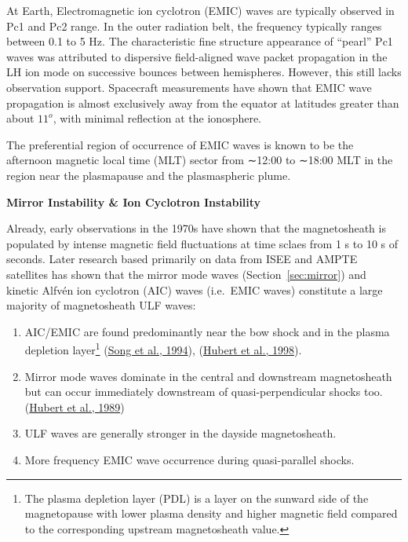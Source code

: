\documentclass[
  notoc %
]{tufte-book}
\providecommand{\tightlist}{%
  \setlength{\itemsep}{0pt}\setlength{\parskip}{0pt}
}
\begin{document}
At Earth, Electromagnetic ion cyclotron (EMIC) waves are typically
observed in Pc1 and Pc2 range. In the outer radiation belt, the
frequency typically ranges between 0.1 to 5 Hz. The characteristic fine
structure appearance of ``pearl'' Pc1 waves was attributed to dispersive
field-aligned wave packet propagation in the LH ion mode on successive
bounces between hemispheres. However, this still lacks observation
support. Spacecraft measurements have shown that EMIC wave propagation
is almost exclusively away from the equator at latitudes greater than
about \(11^o\), with minimal reflection at the ionosphere.

The preferential region of occurrence of EMIC waves is known to be the
afternoon magnetic local time (MLT) sector from ∼12:00 to ∼18:00 MLT in
the region near the plasmapause and the plasmaspheric plume.

\textbf{Mirror Instability \& Ion Cyclotron Instability}

Already, early observations in the 1970s have shown that the
magnetosheath is populated by intense magnetic field fluctuations at
time sclaes from 1 s to 10 s of seconds. Later research based primarily
on data from ISEE and AMPTE satellites has shown that the mirror mode
waves (Section~\ref{sec:mirror}) and kinetic Alfvén ion cyclotron (AIC)
waves (i.e.~EMIC waves) constitute a large majority of magnetosheath ULF
waves:

\begin{enumerate}
\def\labelenumi{\arabic{enumi}.}
\tightlist
\item
  AIC/EMIC are found predominantly near the bow shock and in the plasma
  depletion layer\footnote{The plasma depletion layer (PDL) is a layer
    on the sunward side of the magnetopause with lower plasma density
    and higher magnetic field compared to the corresponding upstream
    magnetosheath value.}
  (\protect\hyperlink{ref-song1994identification}{Song et al., 1994}),
  (\protect\hyperlink{ref-hubert1998nature}{Hubert et al., 1998}).
\item
  Mirror mode waves dominate in the central and downstream magnetosheath
  but can occur immediately downstream of quasi-perpendicular shocks
  too. (\protect\hyperlink{ref-hubert1989observation}{Hubert et al.,
  1989})
\item
  ULF waves are generally stronger in the dayside magnetosheath.
\item
  More frequency EMIC wave occurrence during quasi-parallel shocks.
\end{enumerate}
\end{document}
